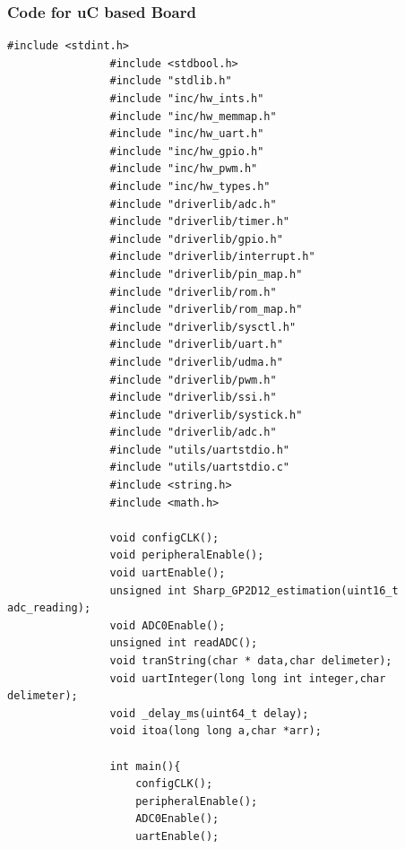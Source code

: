 \documentclass[a4paper,10pt,oneside]{article}
\begin{document}
			\subsubsection{\textbf{Code for uC based Board}}
			\begin{lstlisting}[style=CStyle]
				#include <stdint.h>
				#include <stdbool.h>
				#include "stdlib.h"
				#include "inc/hw_ints.h"
				#include "inc/hw_memmap.h"
				#include "inc/hw_uart.h"
				#include "inc/hw_gpio.h"
				#include "inc/hw_pwm.h"
				#include "inc/hw_types.h"
				#include "driverlib/adc.h"
				#include "driverlib/timer.h"
				#include "driverlib/gpio.h"
				#include "driverlib/interrupt.h"
				#include "driverlib/pin_map.h"
				#include "driverlib/rom.h"
				#include "driverlib/rom_map.h"
				#include "driverlib/sysctl.h"
				#include "driverlib/uart.h"
				#include "driverlib/udma.h"
				#include "driverlib/pwm.h"
				#include "driverlib/ssi.h"
				#include "driverlib/systick.h"
				#include "driverlib/adc.h"
				#include "utils/uartstdio.h"
				#include "utils/uartstdio.c"
				#include <string.h>
				#include <math.h>
				
				void configCLK();
				void peripheralEnable();
				void uartEnable();
				unsigned int Sharp_GP2D12_estimation(uint16_t adc_reading);
				void ADC0Enable();
				unsigned int readADC();
				void tranString(char * data,char delimeter);
				void uartInteger(long long int integer,char delimeter);
				void _delay_ms(uint64_t delay);
				void itoa(long long a,char *arr);
				
				int main(){
					configCLK();
					peripheralEnable();
					ADC0Enable();
					uartEnable();
					

\end{lstlisting}
\end{document}
